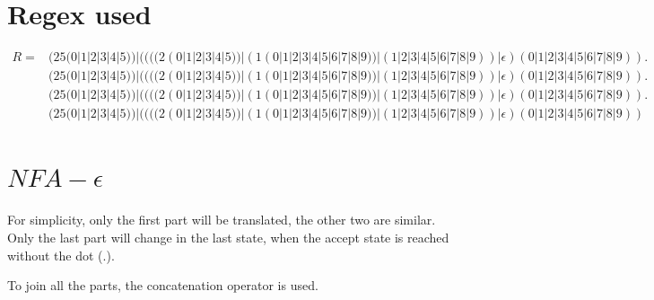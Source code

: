 \documentclass[a3paper]{report}
\begin{document}
\section*{Regex used}

\begin{equation}
    \begin{split}
        R = & (25(0|1|2|3|4|5))|((((2(0|1|2|3|4|5))|(1(0|1|2|3|4|5|6|7|8|9))|(1|2|3|4|5|6|7|8|9))|\epsilon)(0|1|2|3|4|5|6|7|8|9)). \\
        & (25(0|1|2|3|4|5))|((((2(0|1|2|3|4|5))|(1(0|1|2|3|4|5|6|7|8|9))|(1|2|3|4|5|6|7|8|9))|\epsilon)(0|1|2|3|4|5|6|7|8|9)). \\
        & (25(0|1|2|3|4|5))|((((2(0|1|2|3|4|5))|(1(0|1|2|3|4|5|6|7|8|9))|(1|2|3|4|5|6|7|8|9))|\epsilon)(0|1|2|3|4|5|6|7|8|9)). \\
        & (25(0|1|2|3|4|5))|((((2(0|1|2|3|4|5))|(1(0|1|2|3|4|5|6|7|8|9))|(1|2|3|4|5|6|7|8|9))|\epsilon)(0|1|2|3|4|5|6|7|8|9))
    \end{split}
\end{equation}

\section*{$NFA-\epsilon$}

For simplicity, only the first part will be translated, the other two are similar. Only the last part will change in the last state, when the accept state is reached without the dot (.).

To join all the parts, the concatenation operator is used.
\end{document}
